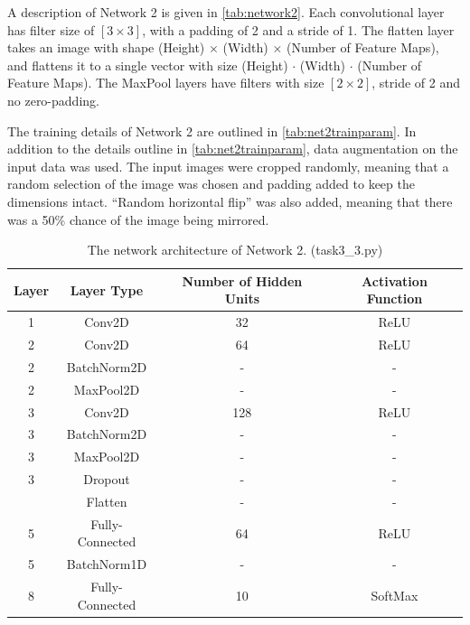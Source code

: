 \documentclass{article}
\begin{document}
A description of Network 2 is given in \autoref{tab:network2}. Each convolutional layer has filter size of $[3\times 3]$, with a padding of 2 and a stride of 1. The flatten layer takes an image with shape (Height) $\times$ (Width) $\times$ (Number of Feature Maps), and flattens
it to a single vector with size (Height) $\cdot$ (Width) $\cdot$ (Number of Feature Maps). The MaxPool layers have filters with size $[2\times2]$, stride of 2 and no zero-padding.

The training details of Network 2 are outlined in \autoref{tab:net2trainparam}. In addition to the details outline in \autoref{tab:net2trainparam}, data augmentation on the input data was used. The input images were cropped randomly, meaning that a random selection of the image was chosen and padding added to keep the dimensions intact. ``Random horizontal flip'' was also added, meaning that there was a 50\% chance of the image being mirrored.   

\begin{table}[H]
\centering
\caption{The network architecture of Network 2. (task3\_3.py)}
\label{tab:network2}
\begin{tabular}{c|c|c|c}
\textbf{Layer} & \textbf{Layer Type} & \textbf{Number of Hidden Units} & \textbf{Activation Function} \\ \hline
1 & Conv2D & 32 & ReLU \\
2 & Conv2D & 64 & ReLU \\
2 & BatchNorm2D & - & - \\
2 & MaxPool2D & - & - \\
3 & Conv2D & 128 & ReLU \\
3 & BatchNorm2D & - & - \\
3 & MaxPool2D & - & - \\
3 & Dropout & - & - \\\hline
 & Flatten & - & - \\
5 & Fully-Connected & 64 & ReLU \\
5 & BatchNorm1D & - & - \\
8 & Fully-Connected & 10 & SoftMax \\
\end{tabular}
\end{table}

\begin{table}[]
\centering
\caption{Training parameters used when training Network 2.}
\label{tab:net2trainparam}
\end{table}
\end{document}
